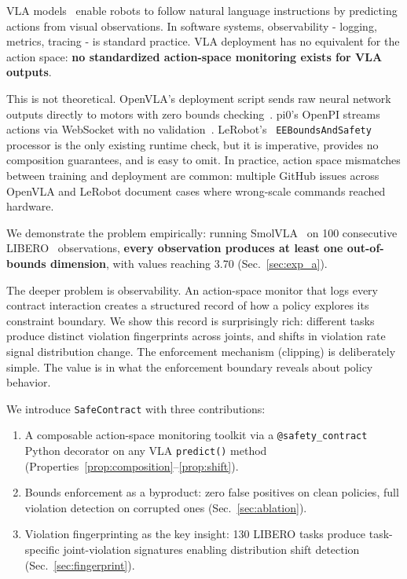 \documentclass[conference]{IEEEtran}
\begin{document}
VLA models~\cite{openvla,smolvla} enable robots to follow natural language instructions by predicting actions from visual observations.
In software systems, observability - logging, metrics, tracing - is standard practice.
VLA deployment has no equivalent for the action space: \textbf{no standardized action-space monitoring exists for VLA outputs}.

This is not theoretical.
OpenVLA's deployment script sends raw neural network outputs directly to motors with zero bounds checking~\cite{openvla}.
pi0's OpenPI streams actions via WebSocket with no validation~\cite{pi0}.
LeRobot's~\cite{lerobot} \texttt{EEBoundsAndSafety} processor is the only existing runtime check, but it is imperative, provides no composition guarantees, and is easy to omit.
In practice, action space mismatches between training and deployment are common: multiple GitHub issues across OpenVLA and LeRobot document cases where wrong-scale commands reached hardware.

We demonstrate the problem empirically: running SmolVLA~\cite{smolvla} on 100 consecutive LIBERO~\cite{libero} observations, \textbf{every observation produces at least one out-of-bounds dimension}, with values reaching 3.70 (Sec.~\ref{sec:exp_a}).

The deeper problem is observability.
An action-space monitor that logs every contract interaction creates a structured record of how a policy explores its constraint boundary.
We show this record is surprisingly rich: different tasks produce distinct violation fingerprints across joints, and shifts in violation rate signal distribution change.
The enforcement mechanism (clipping) is deliberately simple. The value is in what the enforcement boundary reveals about policy behavior.

We introduce \texttt{SafeContract} with three contributions:
\begin{enumerate}
    \item A composable action-space monitoring toolkit via a \texttt{@safety\_contract} Python decorator on any VLA \texttt{predict()} method (Properties~\ref{prop:composition}--\ref{prop:shift}).
    \item Bounds enforcement as a byproduct: zero false positives on clean policies, full violation detection on corrupted ones (Sec.~\ref{sec:ablation}).
    \item Violation fingerprinting as the key insight: 130 LIBERO tasks produce task-specific joint-violation signatures enabling distribution shift detection (Sec.~\ref{sec:fingerprint}).
\end{enumerate}
\end{document}
